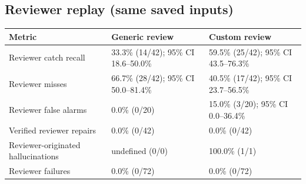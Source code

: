 \documentclass{article}
\begin{document}
\subsection*{Reviewer replay (same saved inputs)}
\begin{center}
\small
\begin{tabularx}{\linewidth}{lXX}
\toprule
Metric & Generic review & Custom review \\
\midrule
Reviewer catch recall & 33.3\% (14/42); 95\% CI 18.6--50.0\% & 59.5\% (25/42); 95\% CI 43.5--76.3\% \\
Reviewer misses & 66.7\% (28/42); 95\% CI 50.0--81.4\% & 40.5\% (17/42); 95\% CI 23.7--56.5\% \\
Reviewer false alarms & 0.0\% (0/20) & 15.0\% (3/20); 95\% CI 0.0--36.4\% \\
Verified reviewer repairs & 0.0\% (0/42) & 0.0\% (0/42) \\
Reviewer-originated hallucinations & undefined (0/0) & 100.0\% (1/1) \\
Reviewer failures & 0.0\% (0/72) & 0.0\% (0/72) \\
\bottomrule
\end{tabularx}
\end{center}
\end{document}
